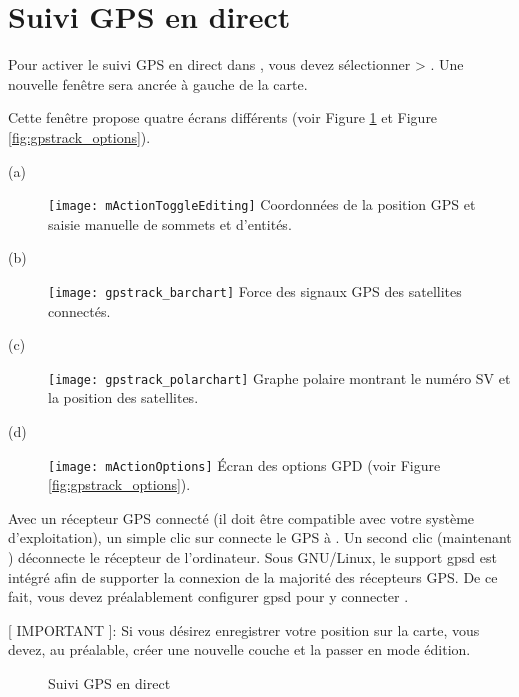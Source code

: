 \section{Suivi GPS en direct} \label{sec:gpstracking}

Pour activer le suivi GPS en direct dans \qg, vous devez sélectionner  > . Une nouvelle fenêtre sera ancrée à gauche de la carte.

Cette fenêtre propose quatre écrans différents (voir Figure \ref{fig:gpstrack_live} et Figure \ref{fig:gpstrack_options}).

\begin{description}
 \item[(a)] \texttt{[image: mActionToggleEditing]} 
Coordonnées de la position GPS et saisie manuelle de sommets et d'entités.
 \item[(b)] \texttt{[image: gpstrack\_barchart]} 
Force des signaux GPS des satellites connectés. 
 \item[(c)] \texttt{[image: gpstrack\_polarchart]} 
Graphe polaire montrant le numéro SV et la position des satellites. 
 \item[(d)] \texttt{[image: mActionOptions]} 
Écran des options GPD (voir Figure \ref{fig:gpstrack_options}).
\end{description}

Avec un récepteur GPS connecté (il doit être compatible avec votre système d'exploitation), un simple clic sur  connecte le GPS à \qg. Un second clic (maintenant ) déconnecte le récepteur de l'ordinateur. Sous GNU/Linux, le support gpsd est intégré afin de supporter la connexion de la majorité des récepteurs GPS. De ce fait, vous devez préalablement configurer gpsd pour y connecter \qg.

[ IMPORTANT ]: Si vous désirez enregistrer votre position sur la carte, vous devez, au préalable, créer une nouvelle couche et la passer en mode édition.

\begin{figure}[ht]
\centering
     \hspace{0.33cm}
     \hspace{0.33cm}
\caption{Suivi GPS en direct \nixcaption} \label{fig:gpstrack_live}
\end{figure}

